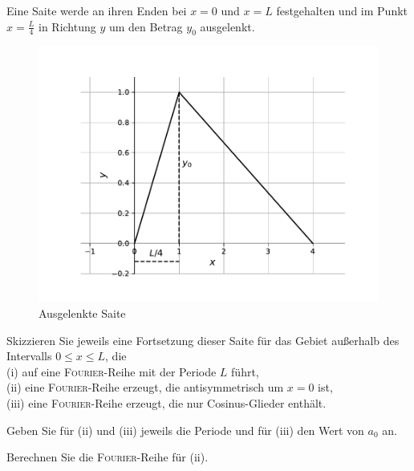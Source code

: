 \documentclass{atistandalonetask}
\begin{document}
  \begin{atiTask}[
    title = Auslenkung einer Seite
  ]
	Eine Saite werde an ihren Enden bei $x=0$ und $x=L$ festgehalten und im Punkt $x=\frac{L}{4}$ in Richtung $y$ um den Betrag $y_0$ ausgelenkt.
	\begin{figure}[H]
	\centering
	\includegraphics[width=0.70\linewidth]{picture-fourier_iv}
	\caption{Ausgelenkte Saite}
	\end{figure}

	\begin{atiSubtasks}
		\item
		Skizzieren Sie jeweils eine Fortsetzung dieser Saite für das Gebiet außerhalb des Intervalls $0\leq x\leq L$, die  \\
		(i) auf eine \textsc{Fourier}-Reihe mit der Periode $L$ führt,\\
		(ii) eine \textsc{Fourier}-Reihe erzeugt, die antisymmetrisch um $x=0$ ist,\\
		(iii) eine \textsc{Fourier}-Reihe erzeugt, die nur Cosinus-Glieder enthält.
		
		\item Geben Sie für (ii) und (iii) jeweils die Periode und für (iii) den Wert von $a_0$ an.
		\item Berechnen Sie die \textsc{Fourier}-Reihe für (ii). 		
	\end{atiSubtasks} 
  \end{atiTask}
  \begin{atiSolution}
   
  \end{atiSolution}
\end{document}
